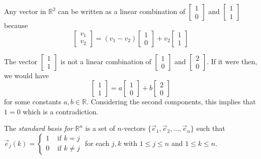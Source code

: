 \begin{example}
Any vector in $\mathbb{R}^2$ can be written as a linear combination of
$\begin{bmatrix}1 \\ 0\end{bmatrix}$ and $\begin{bmatrix}1 \\ 1 \end{bmatrix}$
because
\[
\begin{bmatrix}v_1 \\ v_2\end{bmatrix}=
(v_1-v_2) \begin{bmatrix}1 \\ 0\end{bmatrix}+
v_2 \begin{bmatrix}1 \\ 1 \end{bmatrix}
\]
\end{example}

\begin{example}
The vector $\begin{bmatrix}1 \\ 1\end{bmatrix}$ is not a linear combination
of $\begin{bmatrix}1 \\ 0\end{bmatrix}$ and $\begin{bmatrix}2 \\
0\end{bmatrix}$. If it were then, we would have
\[
\begin{bmatrix}1 \\ 1\end{bmatrix}=
a \begin{bmatrix}1 \\ 0\end{bmatrix}+
b \begin{bmatrix}2 \\ 0 \end{bmatrix}
\]
for some constants $a,b\in \mathbb{R}$. Considering the second components, this
implies that $1=0$ which is a contradiction.
\end{example}

\begin{definition}
The \emph{standard basis for} $\mathbb{R}^n$ is a set of $n$-vectors
$\{\vec{e}_1, \vec{e}_2, \ldots, \vec{e}_n\}$ such that\\
$\vec{e}_j(k)=\begin{cases}
1 & \text{ if } k=j\\
0 & \text{ if } k\neq j
\end{cases}$
for each $j,k$ with $1\le j \le n$ and $1 \le k \le n$.
\end{definition}


